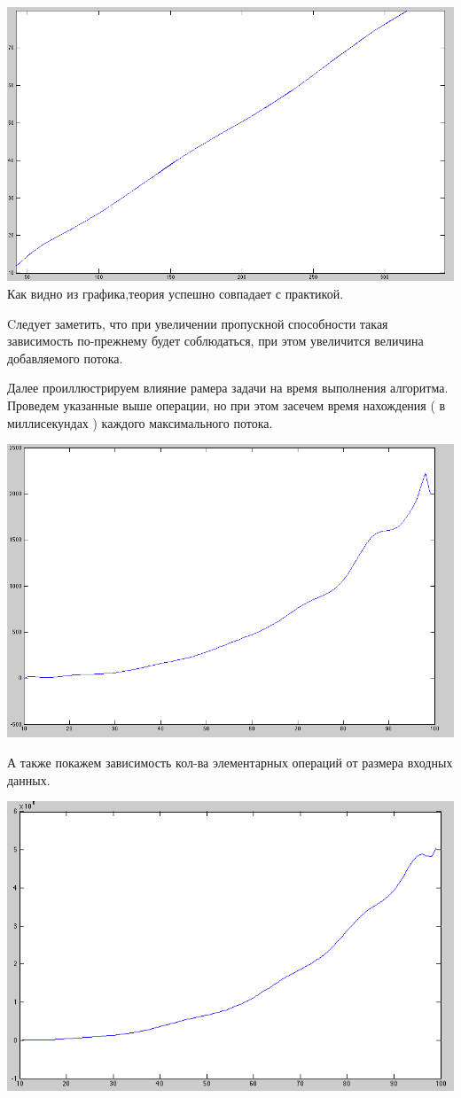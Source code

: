 \documentclass[12pt]{article}
\begin{document}
	\begin{center}
	\includegraphics[width=0.9\linewidth]{kF}\newline
	Как видно из графика,теория успешно совпадает с практикой.
	\end{center}
	\par Cледует заметить, что при увеличении пропускной способности такая зависимость по-прежнему будет соблюдаться, при этом увеличится величина добавляемого потока.
	\par Далее проиллюстрируем влияние рамера задачи на время выполнения алгоритма. Проведем указанные выше операции, но при этом засечем время нахождения ( в миллисекундах ) каждого максимального потока.
	\begin{center}
	\includegraphics[width=0.9\linewidth]{NT}
	\end{center}
	\par А также покажем зависимость кол-ва элементарных операций от размера входных данных.
	\begin{center}
	\includegraphics[width=0.9\linewidth]{NO}
	\end{center}
\end{document}
